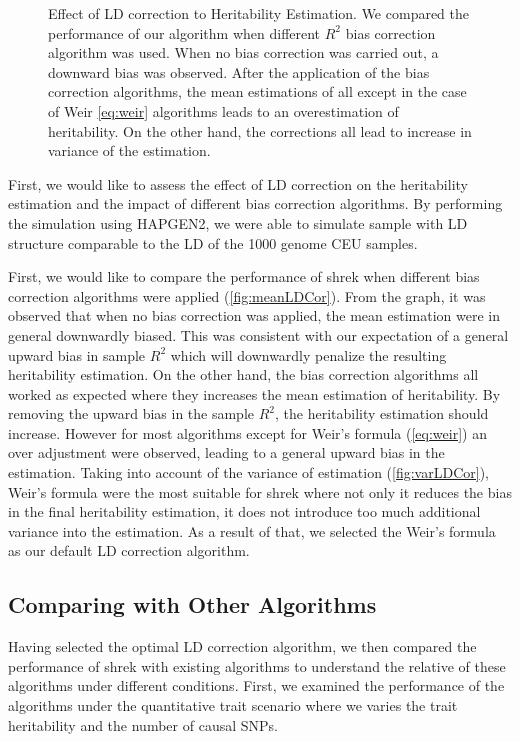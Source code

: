 \begin{figure}[t]
{				\label{fig:varLDCor}
			}
			\caption[Effect of LD correction to Heritability Estimation]
			{Effect of LD correction to Heritability Estimation.
				We compared the performance of our algorithm when different $R^2$ bias correction algorithm was used.
				When no bias correction was carried out, a downward bias was observed. 
				After the application of the bias correction algorithms, the mean estimations of all except in the case of Weir \cref{eq:weir} algorithms leads to an overestimation of heritability.
				On the other hand, the corrections all lead to increase in variance of the estimation.
			} 
			\label{fig:ldCorCom}
		\end{figure}
		First, we would like to assess the effect of \gls{LD} correction on the heritability estimation and the impact of different bias correction algorithms. 
		By performing the simulation using HAPGEN2, we were able to simulate sample with \gls{LD} structure comparable to the \gls{LD} of the 1000 genome \gls{CEU} samples.
		
		First, we would like to compare the performance of \gls{shrek} when different bias correction algorithms were applied (\cref{fig:meanLDCor}).
		From the graph, it was observed that when no bias correction was applied, the mean estimation were in general downwardly biased.
		This was consistent with our expectation of a general upward bias in sample $R^2$ which will downwardly penalize the resulting heritability estimation.
		On the other hand, the bias correction algorithms all worked as expected where they increases the mean estimation of heritability.
		By removing the upward bias in the sample $R^2$, the heritability estimation should increase.
		However for most algorithms except for Weir's formula (\cref{eq:weir}) an over adjustment were observed, leading to a general upward bias in the estimation.
		Taking into account of the variance of estimation (\cref{fig:varLDCor}), Weir's formula were the most suitable for \gls{shrek} where not only it reduces the bias in the final heritability estimation, it does not introduce too much additional variance into the estimation.
		As a result of that, we selected the Weir's formula as our default \gls{LD} correction algorithm.
		
		\subsection{Comparing with Other Algorithms}
		Having selected the optimal \gls{LD} correction algorithm, we then compared the performance of \gls{shrek} with existing algorithms to understand the relative of these algorithms under different conditions.
		First, we examined the performance of the algorithms under the quantitative trait scenario where we varies the trait heritability and the number of causal \glspl{SNP}.
		
